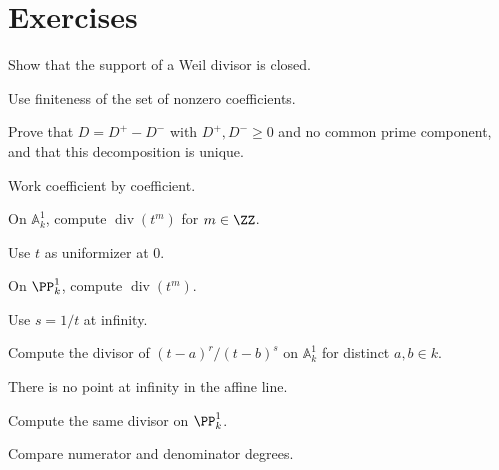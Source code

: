 \section{Exercises}
\begin{exercise}\label{exr:vi39-01}
Show that the support of a Weil divisor is closed.
\end{exercise}
\ifdefined\IncludeExerciseHints
\begin{hint}
Use finiteness of the set of nonzero coefficients.
\end{hint}
\fi
\begin{exercise}\label{exr:vi39-02}
Prove that \(D=D^+-D^-\) with \(D^+,D^-\ge0\) and no common prime component, and that this decomposition is unique.
\end{exercise}
\ifdefined\IncludeExerciseHints
\begin{hint}
Work coefficient by coefficient.
\end{hint}
\fi
\begin{exercise}\label{exr:vi39-03}
On \(\mathbb{A}^1_k\), compute \(\operatorname{div}(t^m)\) for \(m\in\ZZ\).
\end{exercise}
\ifdefined\IncludeExerciseHints
\begin{hint}
Use \(t\) as uniformizer at \(0\).
\end{hint}
\fi
\begin{exercise}\label{exr:vi39-04}
On \(\PP^1_k\), compute \(\operatorname{div}(t^m)\).
\end{exercise}
\ifdefined\IncludeExerciseHints
\begin{hint}
Use \(s=1/t\) at infinity.
\end{hint}
\fi
\begin{exercise}\label{exr:vi39-05}
Compute the divisor of \((t-a)^r/(t-b)^s\) on \(\mathbb{A}^1_k\) for distinct \(a,b\in k\).
\end{exercise}
\ifdefined\IncludeExerciseHints
\begin{hint}
There is no point at infinity in the affine line.
\end{hint}
\fi
\begin{exercise}\label{exr:vi39-06}
Compute the same divisor on \(\PP^1_k\).
\end{exercise}
\ifdefined\IncludeExerciseHints
\begin{hint}
Compare numerator and denominator degrees.
\end{hint}
